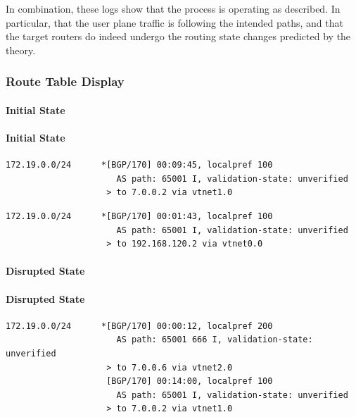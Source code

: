 In combination, these logs show that the process is operating as described.  In particular, that the user plane traffic is following the intended paths, and that the target routers do indeed undergo the routing state changes predicted by the theory.


\subsubsection{Route Table Display}

\paragraph{Initial State}
\paragraph{Initial State}


\begin{lstlisting}[title=As seen at ASBR1]
172.19.0.0/24      *[BGP/170] 00:09:45, localpref 100
                      AS path: 65001 I, validation-state: unverified
                    > to 7.0.0.2 via vtnet1.0
\end{lstlisting}

\begin{lstlisting}[title=As seen at ASBR2]
172.19.0.0/24      *[BGP/170] 00:01:43, localpref 100
                      AS path: 65001 I, validation-state: unverified
                    > to 192.168.120.2 via vtnet0.0
\end{lstlisting}

\paragraph{Disrupted State}
\paragraph{Disrupted State}


\begin{lstlisting}[title=As seen at ASBR1]
172.19.0.0/24      *[BGP/170] 00:00:12, localpref 200
                      AS path: 65001 666 I, validation-state: unverified
                    > to 7.0.0.6 via vtnet2.0
                    [BGP/170] 00:14:00, localpref 100
                      AS path: 65001 I, validation-state: unverified
                    > to 7.0.0.2 via vtnet1.0
\end{lstlisting}

